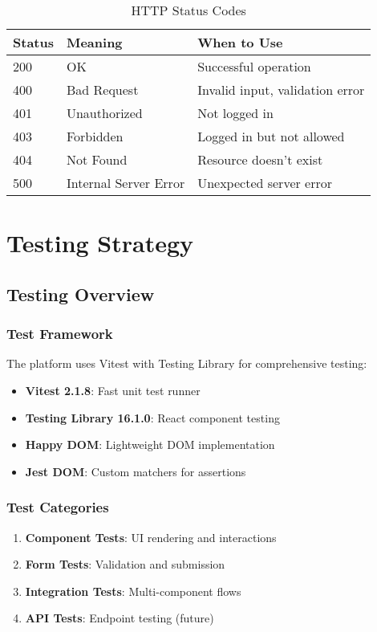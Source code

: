 \documentclass[12pt,a4paper]{report}
\begin{document}
\begin{table}[H]
\centering
\caption{HTTP Status Codes}
\begin{tabular}{@{}lll@{}}
\toprule
\textbf{Status} & \textbf{Meaning} & \textbf{When to Use} \\ \midrule
200 & OK & Successful operation \\
400 & Bad Request & Invalid input, validation error \\
401 & Unauthorized & Not logged in \\
403 & Forbidden & Logged in but not allowed \\
404 & Not Found & Resource doesn't exist \\
500 & Internal Server Error & Unexpected server error \\ \bottomrule
\end{tabular}
\end{table}

\chapter{Testing Strategy}

\section{Testing Overview}

\subsection{Test Framework}

The platform uses Vitest with Testing Library for comprehensive testing:

\begin{itemize}
    \item \textbf{Vitest 2.1.8}: Fast unit test runner
    \item \textbf{Testing Library 16.1.0}: React component testing
    \item \textbf{Happy DOM}: Lightweight DOM implementation
    \item \textbf{Jest DOM}: Custom matchers for assertions
\end{itemize}

\subsection{Test Categories}

\begin{enumerate}
    \item \textbf{Component Tests}: UI rendering and interactions
    \item \textbf{Form Tests}: Validation and submission
    \item \textbf{Integration Tests}: Multi-component flows
    \item \textbf{API Tests}: Endpoint testing (future)
\end{enumerate}
\end{document}
